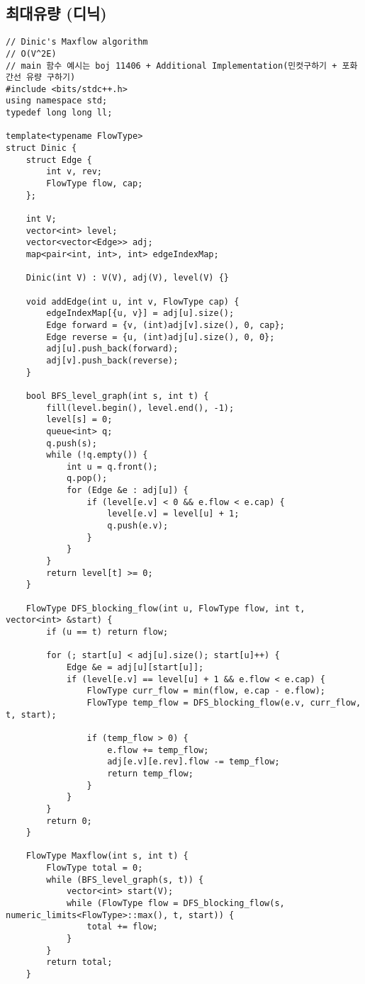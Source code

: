 \documentclass[landscape, 8pt, a4paper, oneside, twocolumn]{extarticle}
\begin{document}
    \subsection{최대유량 (디닉)}
    \begin{verbatim}
// Dinic's Maxflow algorithm
// O(V^2E)
// main 함수 예시는 boj 11406 + Additional Implementation(민컷구하기 + 포화 간선 유량 구하기)
#include <bits/stdc++.h>
using namespace std;
typedef long long ll;

template<typename FlowType>
struct Dinic {
    struct Edge {
        int v, rev;
        FlowType flow, cap;
    };

    int V;
    vector<int> level;
    vector<vector<Edge>> adj;
    map<pair<int, int>, int> edgeIndexMap;

    Dinic(int V) : V(V), adj(V), level(V) {}

    void addEdge(int u, int v, FlowType cap) {
        edgeIndexMap[{u, v}] = adj[u].size();
        Edge forward = {v, (int)adj[v].size(), 0, cap};
        Edge reverse = {u, (int)adj[u].size(), 0, 0};
        adj[u].push_back(forward);
        adj[v].push_back(reverse);
    }

    bool BFS_level_graph(int s, int t) {
        fill(level.begin(), level.end(), -1);
        level[s] = 0;
        queue<int> q;
        q.push(s);
        while (!q.empty()) {
            int u = q.front();
            q.pop();
            for (Edge &e : adj[u]) {
                if (level[e.v] < 0 && e.flow < e.cap) {
                    level[e.v] = level[u] + 1;
                    q.push(e.v);
                }
            }
        }
        return level[t] >= 0;
    }

    FlowType DFS_blocking_flow(int u, FlowType flow, int t, vector<int> &start) {
        if (u == t) return flow;

        for (; start[u] < adj[u].size(); start[u]++) {
            Edge &e = adj[u][start[u]];
            if (level[e.v] == level[u] + 1 && e.flow < e.cap) {
                FlowType curr_flow = min(flow, e.cap - e.flow);
                FlowType temp_flow = DFS_blocking_flow(e.v, curr_flow, t, start);

                if (temp_flow > 0) {
                    e.flow += temp_flow;
                    adj[e.v][e.rev].flow -= temp_flow;
                    return temp_flow;
                }
            }
        }
        return 0;
    }

    FlowType Maxflow(int s, int t) {
        FlowType total = 0;
        while (BFS_level_graph(s, t)) {
            vector<int> start(V);
            while (FlowType flow = DFS_blocking_flow(s, numeric_limits<FlowType>::max(), t, start)) {
                total += flow;
            }
        }
        return total;
    }


\end{verbatim}
\end{document}
